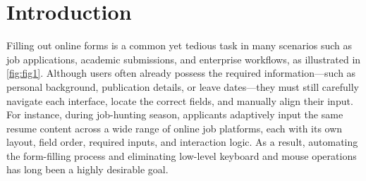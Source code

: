 \documentclass[sigconf, screen, review]{acmart}
\newcommand{\bobo}[1]{%
  \begin{CJK}{UTF8}{gbsn} %
  {\color{cyan}Bobo: #1}%
  \end{CJK}%
}
\begin{document}

\maketitle


\section{Introduction}







Filling out online forms is a common yet tedious task in many scenarios such as job applications, academic submissions, and enterprise workflows, as illustrated in \cref{fig:fig1}.
Although users often already possess the required information—such as personal background, publication details, or leave dates—they must still carefully navigate each interface, locate the correct fields, and manually align their input.
For instance, during job-hunting season, applicants adaptively input the same resume content across a wide range of online job platforms, each with its own layout, field order, required inputs, and interaction logic.
As a result, automating the form-filling process and eliminating low-level keyboard and mouse operations has long been a highly desirable goal.
\end{document}
